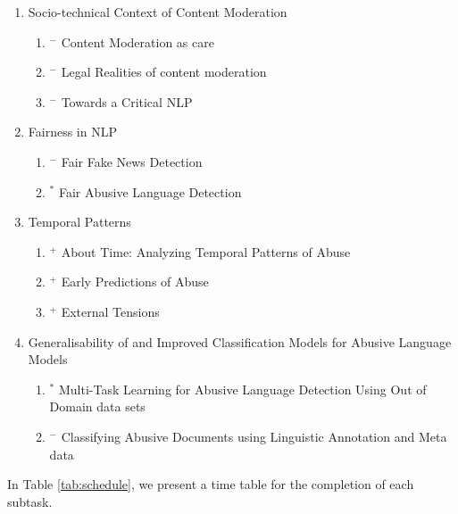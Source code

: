 \begin{enumerate}
  \item{Socio-technical Context of Content Moderation}
    \begin{enumerate}
      \item{$^-$ Content Moderation as care}
      \item{$^-$ Legal Realities of content moderation}
      \item{$^-$ Towards a Critical NLP}
    \end{enumerate}
  \item{Fairness in NLP}
    \begin{enumerate}
      \item{$^-$ Fair Fake News Detection}
      \item{$^*$ Fair Abusive Language Detection}
    \end{enumerate}
  \item{Temporal Patterns}
    \begin{enumerate}
      \item{$^+$ About Time: Analyzing Temporal Patterns of Abuse}
      \item{$^+$ Early Predictions of Abuse}
      \item{$^+$ External Tensions}
    \end{enumerate}
  \item{Generalisability of and Improved Classification Models for Abusive Language Models}
    \begin{enumerate}
      \item{$^*$ Multi-Task Learning for Abusive Language Detection Using Out of Domain data sets}
      \item{$^-$ Classifying Abusive Documents using Linguistic Annotation and Meta data}
    \end{enumerate}
\end{enumerate}

In Table \autoref{tab:schedule}, we present a time table for the completion of each subtask.


